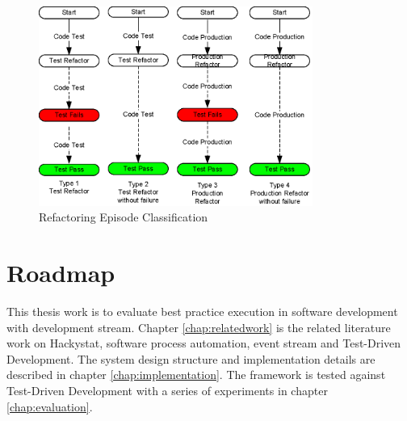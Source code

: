 \pagebreak
\begin{figure}[h] 
  \centering
  \includegraphics[width=0.8\textwidth]{figs/Refactoring.eps}
  \caption{Refactoring Episode Classification}\label{fig:refactoring}
\end{figure} 

\section{Roadmap}
This thesis work is to evaluate best practice execution in software development 
with development stream. Chapter \ref{chap:relatedwork} is the related
literature work on Hackystat, software process automation, event stream and
Test-Driven Development. The system design structure and implementation details
are described in chapter \ref{chap:implementation}. The framework is tested
against Test-Driven Development with a series of experiments in 
chapter \ref{chap:evaluation}.

